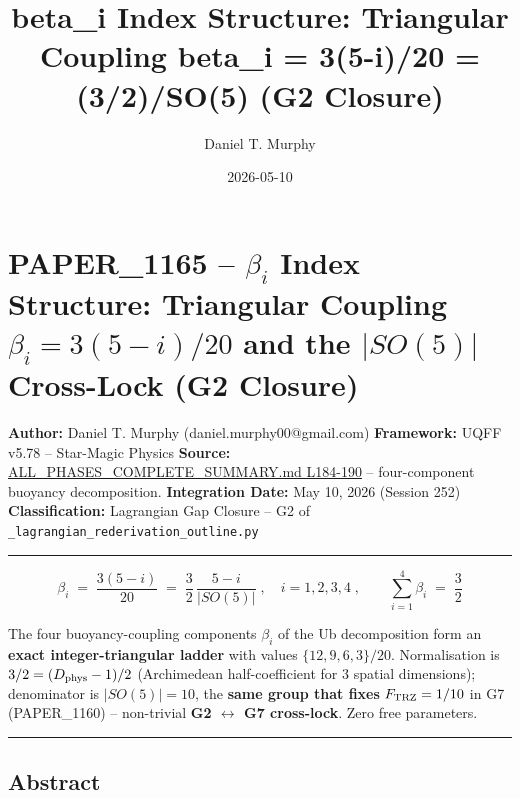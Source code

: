 \documentclass[
]{article}
\title{beta\_i Index Structure: Triangular Coupling beta\_i = 3(5-i)/20
= (3/2)/\textbar SO(5)\textbar{} (G2 Closure)}
\author{Daniel T. Murphy}
\date{2026-05-10}
\begin{document}
\maketitle

\section{\texorpdfstring{PAPER\_1165 -- \(\beta_i\) Index Structure:
Triangular Coupling \(\beta_i = 3(5-i)/20\) and the \(|SO(5)|\)
Cross-Lock (G2
Closure)}{PAPER\_1165 -- \textbackslash beta\_i Index Structure: Triangular Coupling \textbackslash beta\_i = 3(5-i)/20 and the \textbar SO(5)\textbar{} Cross-Lock (G2 Closure)}}\label{paper_1165-beta_i-index-structure-triangular-coupling-beta_i-35-i20-and-the-so5-cross-lock-g2-closure}

\textbf{Author:} Daniel T. Murphy (daniel.murphy00@gmail.com)
\textbf{Framework:} UQFF v5.78 -- Star-Magic Physics \textbf{Source:}
\href{ALL_PHASES_COMPLETE_SUMMARY.md\#L184}{ALL\_PHASES\_COMPLETE\_SUMMARY.md
L184-190} -- four-component buoyancy decomposition. \textbf{Integration
Date:} May 10, 2026 (Session 252) \textbf{Classification:} Lagrangian
Gap Closure -- G2 of \texttt{\_lagrangian\_rederivation\_outline.py}

\begin{center}\rule{0.5\linewidth}{0.5pt}\end{center}

\[\boxed{\;\beta_i \;=\; \frac{3(5-i)}{20} \;=\; \frac{3}{2}\,\frac{5-i}{|SO(5)|}\;,\quad i = 1,2,3,4\;,\qquad \sum_{i=1}^{4}\beta_i \;=\; \frac{3}{2}\;}\]

The four buoyancy-coupling components \(\beta_i\) of the Ub
decomposition form an \textbf{exact integer-triangular ladder} with
values \(\{12,9,6,3\}/20\). Normalisation is
\textbf{\(3/2 = (D_{\rm phys}-1)/2\)} (Archimedean half-coefficient for
3 spatial dimensions); denominator is \(|SO(5)| = 10\), the \textbf{same
group that fixes} \(F_{\rm TRZ} = 1/10\) in G7 (PAPER\_1160) --
non-trivial \textbf{G2 \(\leftrightarrow\) G7 cross-lock}. Zero free
parameters.

\begin{center}\rule{0.5\linewidth}{0.5pt}\end{center}

\subsection{Abstract}\label{abstract}
\end{document}
